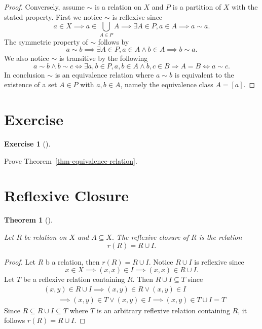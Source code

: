 \documentclass[
  letterpaper,
  10pt,
  reqno,
  twopage,
  openany]{book}
\theoremstyle{plain}
\theoremstyle{definition}
\newtheorem{exercise}{Exercise}[chapter]
\theoremstyle{definition}
\theoremstyle{definition}
\theoremstyle{plain}
\theoremstyle{plain}
\newtheorem{theorem}{Theorem}[chapter]
\theoremstyle{remark}
\begin{document}
\begin{proof}
Conversely, assume \(\sim\) is a relation on \(X\) and \(P\) is a
partition of \(X\) with the stated property. First we notice \(\sim\) is
reflexive since \[
a\in X \implies a\in\bigcup_{A\in P} A \implies \exists A\in P, a\in A \implies a\sim a.
\] The symmetric property of \(\sim\) follows by \[
a\sim b \implies \exists A\in P, a\in A \land b\in A \implies b\sim a.
\] We also notice \(\sim\) is transitive by the following \[
a\sim b \land b\sim c
\Leftrightarrow \exists a, b\in P, a,b\in A\land b,c\in B
\Longrightarrow A=B 
\Leftrightarrow a\sim c.
\] In conclusion \(\sim\) is an equivalence relation where \(a\sim b\)
is equivalent to the existence of a set \(A\in P\) with \(a,b\in A\),
namely the equivalence class \(A=[a].\)

\end{proof}

\hypertarget{exercise}{%
\section{Exercise}\label{exercise}}

\leavevmode{}%
\begin{exercise}[]\label{exr-equivalence-relation}

Prove Theorem~\ref{thm-equivalence-relation}.

\end{exercise}

\hypertarget{reflexive-closure}{%
\section{Reflexive Closure}\label{reflexive-closure}}

\leavevmode{}%
\begin{theorem}[]\label{thm-reflexive-closure}

Let \(R\) be relation on \(X\) and \(A\subseteq X.\) The reflexive
closure of \(R\) is the relation \[
r(R)=R \cup I.
\]

\end{theorem}

\begin{proof}

Let \(R\) b a relation, then \(r(R)=R\cup I.\) Notice \(R\cup I\) is
reflexive since \[
x\in X \implies (x,x)\in I\implies (x,x)\in R\cup I.
\] Let \(T\) be a reflexive relation containing \(R.\) Then
\(R\cup I\subseteq T\) since \begin{align*}
& (x,y)\in R\cup I 
\implies (x,y)\in R \lor (x,y)\in I  
\\&\qquad 
\implies (x,y)\in T \lor (x,y)\in I 
\implies (x,y)\in T \cup I =T 
\end{align*} Since \(R\subseteq R\cup I \subseteq T\) where \(T\) is an
arbitrary reflexive relation containing \(R\), it follows
\(r(R)=R\cup I.\)

\end{proof}
\end{document}
